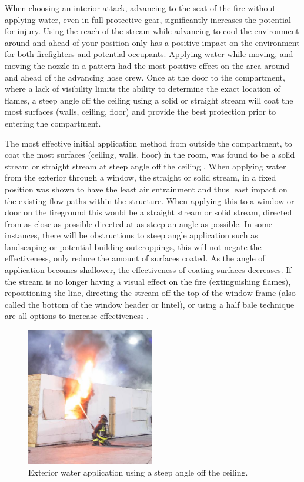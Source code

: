 \documentclass[12pt,oneside]{book}
\begin{document}
When choosing an interior attack, advancing to the seat of the fire without applying water, even in full protective gear, significantly increases the potential for injury. Using the reach of the stream while advancing to cool the environment around and ahead of your position only has a positive impact on the environment for both firefighters and potential occupants. Applying water while moving, and moving the nozzle in a pattern had the most positive effect on the area around and ahead of the advancing hose crew. Once at the door to the compartment, where a lack of visibility limits the ability to determine the exact location of flames, a steep angle off the ceiling using a solid or straight stream will coat the most surfaces (walls, ceiling, floor) and provide the best protection prior to entering the compartment. 

The most effective initial application method from outside the compartment, to coat the most surfaces (ceiling, walls, floor) in the room, was found to be a solid stream or straight stream at steep angle off the ceiling \cite{Weinchenk_watermapping}. When applying water from the exterior through a window, the straight or solid stream, in a fixed position was shown to have the least air entrainment \cite{Weinchenk_airentrainment} and thus least impact on the existing flow paths within the structure. When applying this to a window or door on the fireground this would be a straight stream or solid stream, directed from as close as possible directed at as steep an angle as possible. In some instances, there will be obstructions to steep angle application such as landscaping or potential building outcroppings, this will not negate the effectiveness, only reduce the amount of surfaces coated. As the angle of application becomes shallower, the effectiveness of coating surfaces decreases. If the stream is no longer having a visual effect on the fire (extinguishing flames), repositioning the line, directing the stream off the top of the window frame (also called the bottom of the window header or lintel), or using a half bale technique are all options to increase effectiveness \cite{Weinchenk_watermapping}. 

\begin{figure}[H]
\centering
\includegraphics[width=0.495\textwidth]{../0_Images/Tactical_Considerations/Water_App_Direction/Exterior_Application.jpg}
\caption[Application Tactic - Exterior Attack]{Exterior water application using a steep angle off the ceiling.}
\label{fig:water_app_dir_TC_app_method}
\end{figure}
\end{document}
